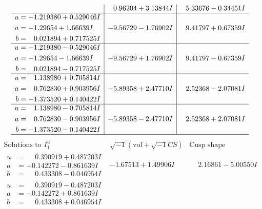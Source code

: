 \documentclass[1p]{elsarticle_modified}
\theoremstyle{definition}
\newcommand{\I}{\sqrt{-1}}
\begin{document}
$$\begin{array}{c|c|c}
 & \phantom{-}0.96204 + 3.13844 I & \phantom{-}5.33676 - 0.34451 I \\ \hline\begin{aligned}
u &= -1.219380 + 0.529046 I \\
a &= -1.29654 + 1.66639 I \\
b &= \phantom{-}0.021894 + 0.717525 I\end{aligned}
 & -9.56729 - 1.76902 I & \phantom{-}9.41797 + 0.67359 I \\ \hline\begin{aligned}
u &= -1.219380 - 0.529046 I \\
a &= -1.29654 - 1.66639 I \\
b &= \phantom{-}0.021894 - 0.717525 I\end{aligned}
 & -9.56729 + 1.76902 I & \phantom{-}9.41797 - 0.67359 I \\ \hline\begin{aligned}
u &= \phantom{-}1.138980 + 0.705814 I \\
a &= \phantom{-}0.762830 + 0.903956 I \\
b &= -1.373520 + 0.140422 I\end{aligned}
 & -5.89358 + 2.47710 I & \phantom{-}2.52368 - 2.07081 I \\ \hline\begin{aligned}
u &= \phantom{-}1.138980 - 0.705814 I \\
a &= \phantom{-}0.762830 - 0.903956 I \\
b &= -1.373520 - 0.140422 I\end{aligned}
 & -5.89358 - 2.47710 I & \phantom{-}2.52368 + 2.07081 I\\
 \hline 
 \end{array}$$\newpage$$\begin{array}{c|c|c}  
\text{Solutions to }I^u_{1}& \I (\text{vol} + \sqrt{-1}CS) & \text{Cusp shape}\\
 \hline 
\begin{aligned}
u &= \phantom{-}0.390919 + 0.487203 I \\
a &= -0.142272 - 0.861639 I \\
b &= \phantom{-}0.433308 - 0.046954 I\end{aligned}
 & -1.67513 + 1.49906 I & \phantom{-}2.16861 - 5.00550 I \\ \hline\begin{aligned}
u &= \phantom{-}0.390919 - 0.487203 I \\
a &= -0.142272 + 0.861639 I \\
b &= \phantom{-}0.433308 + 0.046954 I\end{aligned}

\end{array}$$
\end{document}
